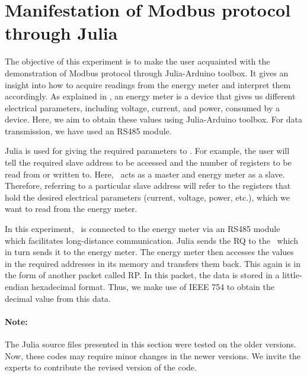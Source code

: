 
\section{Manifestation of Modbus protocol through Julia}
The objective of this experiment is to make the user acquainted with
the demonstration of Modbus protocol through Julia-Arduino toolbox.
It gives an insight into how to acquire readings from the energy meter and interpret them accordingly. As explained in ,
an energy meter is a device that gives us different electrical parameters, including voltage, current, and power, consumed by a device.
Here, we aim to obtain these values using Julia-Arduino toolbox. For data transmission, we have used an RS485 module.

Julia is used for giving the required parameters to \arduino. For
example, the user will tell the required slave address to be accessed
and the number of registers to be read from or written to. Here,
\arduino\ acts as a master and energy meter as a slave. Therefore,
referring to a particular slave address will refer to the registers
that hold the desired electrical parameters (current, voltage, power, etc.), which we want to read from the energy meter.

In this experiment, \arduino\ is connected to the energy meter via an RS485 module which facilitates long-distance communication.
Julia sends the RQ to the \arduino\, which in turn sends it to the
energy meter. The energy meter then accesses the values in the
required addresses in its memory and transfers them back. This again
is in the form of another packet called RP. In this packet, the data is stored in a little-endian hexadecimal format. Thus, we make use of IEEE 754 to obtain the decimal value from this data.

\paragraph{Note: } The Julia source files presented in this section were tested on the older versions. Now, these codes may require minor changes in
the newer versions. We invite the experts to contribute the revised version of the code.



